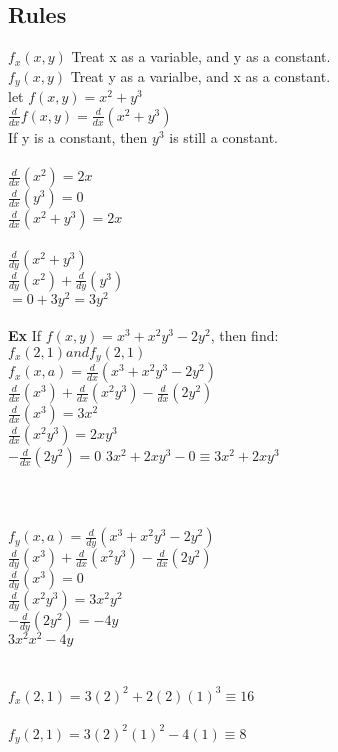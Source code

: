 \documentclass[]{article}
\begin{document}
\subsection*{Rules}
$f_x(x,y)$ Treat x as a variable, and y as a constant.\\
$f_y(x,y)$ Treat y as a varialbe, and x as a constant.\\
let $f(x,y) = x^2+y^3$\\
$\frac{d}{dx}f(x,y) = \frac{d}{dx}(x^2+y^3)$\\
If y is a constant, then $y^3$ is still a constant.\\
\\
$\frac{d}{dx}(x^2) = 2x$\\
$\frac{d}{dx}(y^3) = 0$\\
$\frac{d}{dx}(x^2+y^3) = 2x$\\
\\
$\frac{d}{dy}(x^2+y^3)$\\
$\frac{d}{dy}(x^2) + \frac{d}{dy}(y^3)$\\
$ = 0 + 3y^2 = 3y^2$\\
\\
\textbf{Ex}
If $f(x,y) = x^3+x^2y^3-2y^2$, then find:\\
$f_x(2,1) and f_y(2,1)$\\
$f_x(x,a) = \frac{d}{dx}(x^3+x^2y^3-2y^2)$\\
$\frac{d}{dx}(x^3)+ \frac{d}{dx}(x^2y^3)-\frac{d}{dx}(2y^2)$\\
$\frac{d}{dx}(x^3) = 3x^2$\\
$\frac{d}{dx}(x^2y^3) = 2xy^3$\\
$-\frac{d}{dx}(2y^2) = 0$
$3x^2+2xy^3-0 \equiv 3x^2+2xy^3$\\
\\
\\
\\
$f_y(x,a) = \frac{d}{dy}(x^3+x^2y^3-2y^2)$\\
$\frac{d}{dy}(x^3)+ \frac{d}{dx}(x^2y^3)-\frac{d}{dx}(2y^2)$\\
$\frac{d}{dy}(x^3) = 0$\\
$\frac{d}{dy}(x^2y^3) = 3x^2y^2$\\
$-\frac{d}{dy}(2y^2) = -4y$\\
$3x^2x^2 - 4y$\\
\\
\\
$f_x(2,1) = 3(2)^2 + 2(2)(1)^3 \equiv 16$\\
\\
$f_y(2,1) = 3(2)^2(1)^2 - 4(1) \equiv 8$\\
\end{document}
